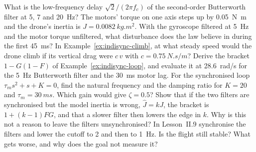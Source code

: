 \begin{exercises}
\exercise[1] What is the low-frequency delay $\sqrt2/(2\pi f_c)$ of the second-order Butterworth filter at 5, 7 and \SI{20}{Hz}?
\exercise[1] The motors' torque on one axis steps up by \SI{0.05}{N.m} and the drone's inertia is $J = \SI{0.0082}{kg.m^2}$. With the gyroscope filtered at \SI{5}{Hz} and the motor torque unfiltered, what disturbance does the law believe in during the first \SI{45}{ms}?
\exercise[1] In Example~\ref{ex:indisync-climb}, at what steady speed would the drone climb if its vertical drag were $c\,v$ with $c = \SI{0.75}{N.s/m}$?
\exercise[2] Derive the bracket $1 - G(1 - F)$ of Example~\ref{ex:indisync-loop}, and evaluate it at \SI{28.6}{rad/s} for the \SI{5}{Hz} Butterworth filter and the \SI{30}{ms} motor lag.
\exercise[2] For the synchronised loop $\tau_m s^2 + s + K = 0$, find the natural frequency and the damping ratio for $K = 20$ and $\tau_m = \SI{30}{ms}$. Which gain would give $\zeta = 0.5$?
\exercise[2] Show that if the two filters are synchronised but the model inertia is wrong, $\hat J = kJ$, the bracket is $1 + (k - 1)FG$, and that a slower filter then lowers the edge in $k$. Why is this not a reason to leave the filters unsynchronised?
\exercise[2] In Lesson~II.9 synchronise the filters and lower the cutoff to 2 and then to \SI{1}{Hz}. Is the flight still stable? What gets worse, and why does the goal not measure it?

\end{exercises}
